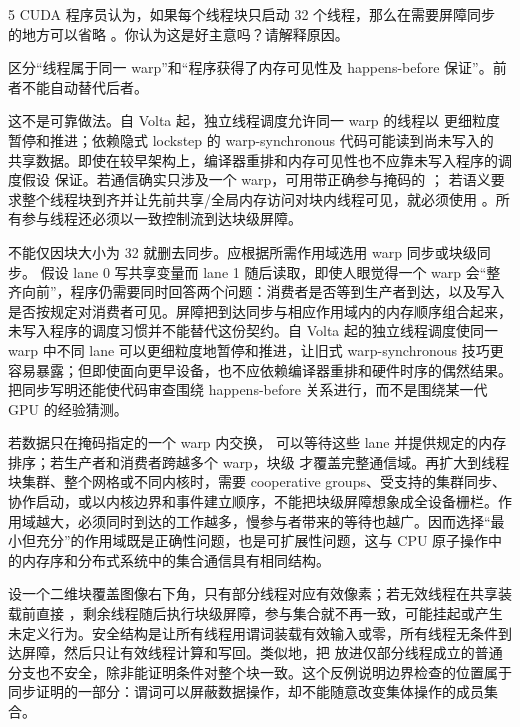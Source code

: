 \begin{solutionexercise}{5}
\problemheading CUDA 程序员认为，如果每个线程块只启动 32 个线程，那么在需要屏障同步
的地方可以省略 。你认为这是好主意吗？请解释原因。

\approachheading 区分“线程属于同一 warp”和“程序获得了内存可见性及 happens-before
保证”。前者不能自动替代后者。

\answerheading 这不是可靠做法。自 Volta 起，独立线程调度允许同一 warp 的线程以
更细粒度暂停和推进；依赖隐式 lockstep 的 warp-synchronous 代码可能读到尚未写入的
共享数据。即使在较早架构上，编译器重排和内存可见性也不应靠未写入程序的调度假设
保证。若通信确实只涉及一个 warp，可用带正确参与掩码的 ；
若语义要求整个线程块到齐并让先前共享/全局内存访问对块内线程可见，就必须使用
。所有参与线程还必须以一致控制流到达块级屏障。

\conclusionheading 不能仅因块大小为 32 就删去同步。应根据所需作用域选用 warp
同步或块级同步。
\discussionheading
{}
假设 lane 0 写共享变量而 lane 1 随后读取，即使人眼觉得一个 warp 会“整齐向前”，程序仍需要同时回答两个问题：消费者是否等到生产者到达，以及写入是否按规定对消费者可见。屏障把到达同步与相应作用域内的内存顺序组合起来，未写入程序的调度习惯并不能替代这份契约。自 Volta 起的独立线程调度使同一 warp 中不同 lane 可以更细粒度地暂停和推进，让旧式 warp-synchronous 技巧更容易暴露；但即使面向更早设备，也不应依赖编译器重排和硬件时序的偶然结果。把同步写明还能使代码审查围绕 happens-before 关系进行，而不是围绕某一代 GPU 的经验猜测。

若数据只在掩码指定的一个 warp 内交换， 可以等待这些 lane 并提供规定的内存排序；若生产者和消费者跨越多个 warp，块级  才覆盖完整通信域。再扩大到线程块集群、整个网格或不同内核时，需要 cooperative groups、受支持的集群同步、协作启动，或以内核边界和事件建立顺序，不能把块级屏障想象成全设备栅栏。作用域越大，必须同时到达的工作越多，慢参与者带来的等待也越广。因而选择“最小但充分”的作用域既是正确性问题，也是可扩展性问题，这与 CPU 原子操作中的内存序和分布式系统中的集合通信具有相同结构。

设一个二维块覆盖图像右下角，只有部分线程对应有效像素；若无效线程在共享装载前直接 ，剩余线程随后执行块级屏障，参与集合就不再一致，可能挂起或产生未定义行为。安全结构是让所有线程用谓词装载有效输入或零，所有线程无条件到达屏障，然后只让有效线程计算和写回。类似地，把  放进仅部分线程成立的普通分支也不安全，除非能证明条件对整个块一致。这个反例说明边界检查的位置属于同步证明的一部分：谓词可以屏蔽数据操作，却不能随意改变集体操作的成员集合。


\end{solutionexercise}
